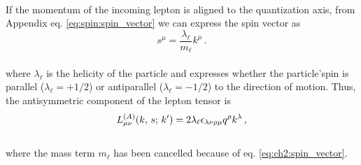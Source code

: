\\ 
If the momentum of the incoming lepton is aligned to the quantization axis, from Appendix eq. \eqref{eq:spin:spin_vector} we can express the spin vector as
\\
\begin{equation}
    s^{\mu} = \frac{\lambda_{\ell}}{m_{\ell}} k^{\mu}\, .
    \label{eq:ch2:spin_vector}
\end{equation}
\\
where $\lambda_{\ell}$ is the helicity of the particle and expresses whether the particle'spin is parallel ($\lambda_{\ell} = +1/2$) or antiparallel ($\lambda_{\ell} = -1/2$) to the direction of motion. Thus, the antisymmetric component of the lepton tensor is
\\
\begin{equation}
    L_{\mu \nu}^{(A)} \qty(k,\,s;\, k') = 2\lambda_{\ell} \epsilon_{\lambda \nu \rho \mu}  q^{\rho} k^{\lambda}\,,
\end{equation}
\\
where the mass term $m_{\ell}$ has been cancelled because of eq. \eqref{eq:ch2:spin_vector}.



